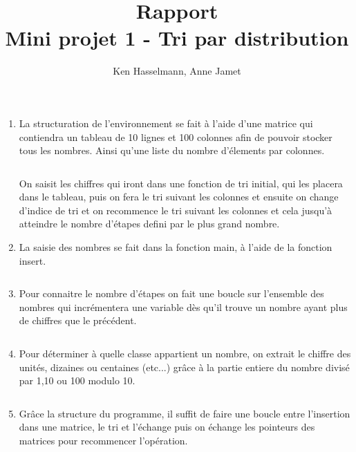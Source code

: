 \documentclass[a4paper]{article}
\author{Ken Hasselmann, Anne Jamet}
\title{Rapport \\ Mini projet 1 - Tri par distribution}
\begin{document}
\maketitle
\thispagestyle{fancy}
\renewcommand{\headrulewidth}{0pt} %

\begin{enumerate}
\item{La structuration de l'environnement se fait à l'aide d'une matrice qui contiendra un tableau de 10 lignes et 100 colonnes afin de pouvoir stocker tous les nombres. Ainsi qu'une liste du nombre d'élements par colonnes.}

\inputminted[linenos,firstline=1,firstnumber=1,lastline = 14]{cpp}{sp/main.h}

On saisit les chiffres qui iront dans une fonction de tri initial, qui les placera dans le tableau, puis on fera le tri suivant les colonnes et ensuite on change d'indice de tri et on recommence le tri suivant les colonnes et cela jusqu'à atteindre le nombre d'étapes defini par le plus grand nombre.
\\

\item{La saisie des nombres se fait dans la fonction main, à l'aide de la fonction insert.}

\inputminted[linenos,firstline=16,firstnumber=16,lastline = 22]{cpp}{sp/main.2.cpp}
\clearpage
\item{Pour connaitre le nombre d'étapes on fait une boucle sur l'ensemble des nombres qui incrémentera une variable dès qu'il trouve un nombre ayant plus de chiffres que le précédent.}

\inputminted[linenos,firstline=24,firstnumber=24,lastline = 24]{cpp}{sp/main.2.cpp}

\item{Pour déterminer à quelle classe appartient un nombre, on extrait le chiffre des unités, dizaines ou centaines (etc...) grâce à la partie entiere du nombre divisé par 1,10 ou 100 modulo 10.}

\inputminted[linenos,firstline=68,firstnumber=68,lastline = 74]{cpp}{sp/main.2.cpp}

\item{Grâce la structure du programme, il suffit de faire une boucle entre l'insertion dans une matrice, le tri et l'échange puis on échange les pointeurs des matrices pour recommencer l'opération.}
\inputminted[linenos,firstline=30,firstnumber=30,lastline = 44]{cpp}{sp/main.2.cpp}

\end{enumerate}
\end{document}
